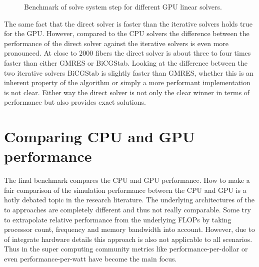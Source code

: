 \documentclass[a4paper,11pt]{kth-mag}
\begin{document}
\begin{figure}
  \centering
  \caption{Benchmark of solve system step for different GPU linear solvers.}
  \label{fig:bench_cuda_solvers}
\end{figure}

The same fact that the direct solver is faster than the iterative solvers holds true for the GPU. However, compared to the CPU solvers the difference between the performance of the direct solver against the iterative solvers is even more pronounced. At close to $2000$ fibers the direct solver is about three to four times faster than either GMRES or BiCGStab. Looking at the difference between the two iterative solvers BiCGStab is slightly faster than GMRES, whether this is an inherent property of the algorithm or simply a more performant implementation is not clear. Either way the direct solver is not only the clear winner in terms of performance but also provides exact solutions.

\section{Comparing CPU and GPU performance}

The final benchmark compares the CPU and GPU performance. How to make a fair comparison of the simulation performance between the CPU and GPU is a hotly debated topic in the research literature. The underlying architectures of the to approaches are completely different and thus not really comparable. Some try to extrapolate relative performance from the underlying FLOPs by taking processor count, frequency and memory bandwidth into account. However, due to of integrate hardware details this approach is also not applicable to all scenarios. Thus in the super computing community metrics like performance-per-dollar or even performance-per-watt have become the main focus.
\end{document}
